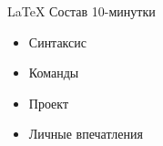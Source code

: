 \begin{frame}[fragile]{\LaTeX}
  Состав 10-минутки
  \begin{itemize}
    \item Синтаксис
    \item Команды
    \item Проект
    \item Личные впечатления  
  \end{itemize}
\end{frame}

